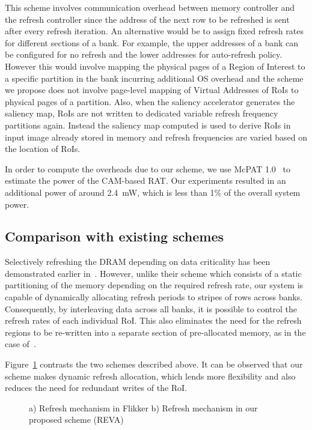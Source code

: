 This scheme involves communication overhead between memory controller and the refresh controller since the address of the next row to be refreshed is sent after every refresh iteration. An alternative would be to assign fixed refresh rates for different sections of a bank. For example, the upper addresses of a bank can be configured for no refresh and the lower addresses for auto-refresh policy. However this would involve mapping the physical pages of a Region of Interest to a specific partition in the bank incurring additional OS overhead and the scheme we propose does not involve page-level mapping of Virtual Addresses of RoIs to physical pages of a partition. Also, when the saliency accelerator generates the saliency map, RoIs are not written to dedicated variable refresh frequency partitions again. Instead the saliency map computed is used to derive RoIs in input image already stored in memory and refresh frequencies are varied based on the location of RoIs. 

In order to compute the overheads due to our scheme, we use McPAT 1.0~\cite{mcpat} to estimate the power of the CAM-based RAT. Our experiments resulted in an additional power of around 2.4~mW, which is less than 1\% of the overall system power. 

\subsection{Comparison with existing schemes}
Selectively refreshing the DRAM depending on data criticality has been demonstrated earlier in~\cite{Liu2011}. However, unlike their scheme which consists of a static partitioning of the memory depending on the required refresh rate, our system is capable of dynamically allocating refresh periods to stripes of rows across banks. Consequently, by interleaving data across all banks, it is possible to control the refresh rates of each individual RoI. 
This also eliminates the need for the refresh regions to be re-written into a separate section of pre-allocated memory, as in the case of~\cite{Liu2011}.

Figure~\ref{fig:reva-refresh} contrasts the two schemes described above. It can be observed that our scheme makes dynamic refresh allocation, which lends more flexibility and also reduces the need for redundant writes of the RoI.

\begin{figure}[ht!]
\centering
{}
\caption{\label{fig:reva-refresh} a) Refresh mechanism in Flikker  b) Refresh mechanism in our proposed scheme (REVA)}
\end{figure}
